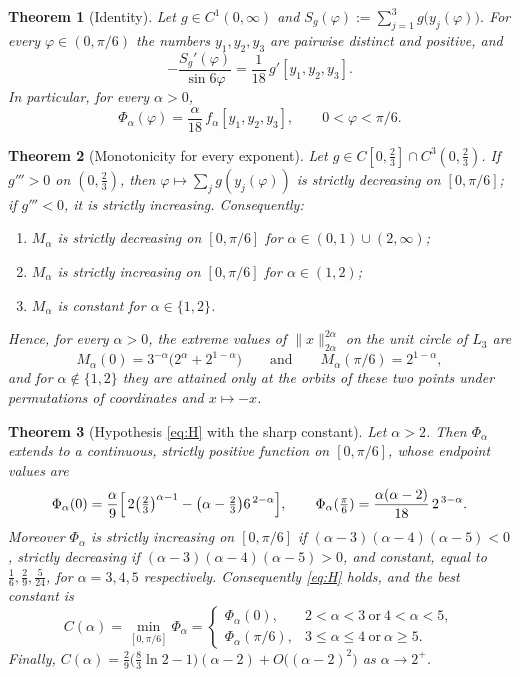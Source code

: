 \documentclass[11pt]{amsart}
\newtheorem{theorem}{Theorem}
\theoremstyle{remark}
\begin{document}
\begin{theorem}[Identity]\label{thm:identity}
Let $g\in C^1(0,\infty)$ and $S_g(\varphi):=\sum_{j=1}^3 g\bigl(y_j(\varphi)\bigr)$. For
every $\varphi\in(0,\pi/6)$ the numbers $y_1,y_2,y_3$ are pairwise distinct and
positive, and
\[
-\frac{S_g'(\varphi)}{\sin 6\varphi}=\frac1{18}\,g'[y_1,y_2,y_3].
\]
In particular, for every $\alpha>0$,
\[
\Phi_\alpha(\varphi)=\frac{\alpha}{18}\,f_\alpha[y_1,y_2,y_3],\qquad 0<\varphi<\pi/6.
\]
\end{theorem}

\begin{theorem}[Monotonicity for every exponent]\label{thm:mono}
Let $g\in C[0,\frac23]\cap C^3(0,\frac23)$. If $g'''>0$ on $(0,\frac23)$, then
$\varphi\mapsto\sum_j g(y_j(\varphi))$ is strictly decreasing on $[0,\pi/6]$; if
$g'''<0$, it is strictly increasing. Consequently:
\begin{enumerate}
\item $M_\alpha$ is strictly decreasing on $[0,\pi/6]$ for $\alpha\in(0,1)\cup(2,\infty)$;
\item $M_\alpha$ is strictly increasing on $[0,\pi/6]$ for $\alpha\in(1,2)$;
\item $M_\alpha$ is constant for $\alpha\in\{1,2\}$.
\end{enumerate}
Hence, for every $\alpha>0$, the extreme values of $\|x\|_{2\alpha}^{2\alpha}$ on the unit
circle of $L_3$ are
\[
M_\alpha(0)=3^{-\alpha}\bigl(2^{\alpha}+2^{1-\alpha}\bigr)\qquad\text{and}\qquad
M_\alpha(\pi/6)=2^{1-\alpha},
\]
and for $\alpha\notin\{1,2\}$ they are attained only at the orbits of these two points
under permutations of coordinates and $x\mapsto -x$.
\end{theorem}

\begin{theorem}[Hypothesis \eqref{eq:H} with the sharp constant]\label{thm:H}
Let $\alpha>2$. Then $\Phi_\alpha$ extends to a continuous, strictly positive function
on $[0,\pi/6]$, whose endpoint values are
\[
\Phi_\alpha(0)=\frac{\alpha}{9}\Bigl[\,2\bigl(\tfrac23\bigr)^{\alpha-1}
-\bigl(\alpha-\tfrac23\bigr)6^{\,2-\alpha}\Bigr],\qquad
\Phi_\alpha(\tfrac{\pi}{6})=\frac{\alpha(\alpha-2)}{18}\,2^{\,3-\alpha}.
\]
Moreover $\Phi_\alpha$ is strictly increasing on $[0,\pi/6]$ if
$(\alpha-3)(\alpha-4)(\alpha-5)<0$, strictly decreasing if
$(\alpha-3)(\alpha-4)(\alpha-5)>0$, and constant, equal to $\frac16,\frac29,\frac5{24}$,
for $\alpha=3,4,5$ respectively. Consequently \eqref{eq:H} holds, and the best constant is
\[
C(\alpha)=\min_{[0,\pi/6]}\Phi_\alpha=
\begin{cases}
\Phi_\alpha(0), & 2<\alpha<3\ \text{or}\ 4<\alpha<5,\\[1mm]
\Phi_\alpha(\pi/6), & 3\le\alpha\le4\ \text{or}\ \alpha\ge5.
\end{cases}
\]
Finally, $C(\alpha)=\frac29\bigl(\frac83\ln2-1\bigr)(\alpha-2)+O\bigl((\alpha-2)^2\bigr)$
as $\alpha\to2^+$.
\end{theorem}
\end{document}
